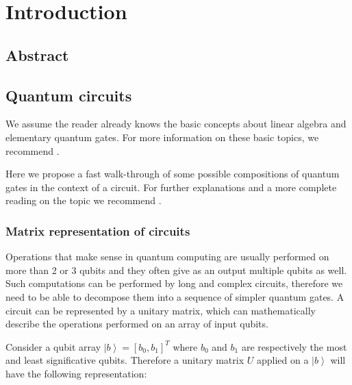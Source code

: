 
\chapter{Introduction}
\label{chp:intro}

\section{Abstract}


\section{Quantum circuits}

We assume the reader already knows the basic concepts about linear algebra and elementary quantum gates. For more information on these basic topics, we recommend \cite{helwer2018quantum, Colin2011Explorations}.

Here we propose a fast walk-through of some possible compositions of quantum gates in the context of a circuit. For further explanations and a more complete reading on the topic we recommend \cite[p. 123--129]{Colin2011Explorations}.

\subsection{Matrix representation of circuits}

Operations that make sense in quantum computing are usually performed on more than 2 or 3 qubits and they often give as an output multiple qubits as well. Such computations can be performed by long and complex circuits, therefore we need to be able to decompose them into a sequence of simpler quantum gates. A circuit can be represented by a unitary matrix, which can mathematically describe the operations performed on an array of input qubits.

Consider a qubit array $\left|b\right\rangle = \left[b_0, b_1\right]^T$ where $b_0$ and $b_1$ are respectively the most and least significative qubits. Therefore a unitary matrix $U$ applied on a $\left|b\right\rangle$ will have the following representation:

